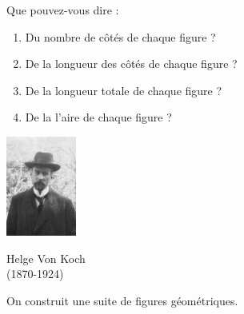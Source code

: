 \documentclass[a4paper,11pt,exos]{nsi} %
\begin{document}
Que pouvez-vous dire :
\begin{enumerate}[label=\textbullet]
    \item Du nombre de côtés de chaque figure ?
    \item De la longueur des côtés de chaque figure ?
    \item De la longueur totale de chaque figure ?
    \item De la l'aire de chaque figure ?
\end{enumerate}

{\includegraphics[width=2.3cm]{Helge_von_Koch.jpg}
\begin{center}
    \tiny{Helge Von Koch\\ (1870-1924)}
\end{center}}


\newpage
{}
\maketitle
On construit une suite de figures géométriques.
\end{document}
